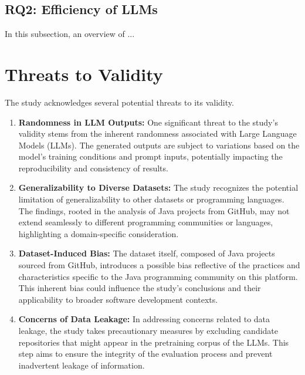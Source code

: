 \vspace{0.1 cm}
\subsection{RQ2: Efficiency of LLMs}
\label{sec:results_rq2}
\vspace{0.1 cm}

In this subsection, an overview of ...

\section{Threats to Validity}
\label{sec:t2v}
\vspace{0.2 cm}

The study acknowledges several potential threats to its validity.

\begin{enumerate}
    \item \textbf{Randomness in LLM Outputs:} One significant threat to the study's validity stems from the inherent randomness associated with Large Language Models (LLMs). The generated outputs are subject to variations based on the model's training conditions and prompt inputs, potentially impacting the reproducibility and consistency of results.

    \item \textbf{Generalizability to Diverse Datasets:} The study recognizes the potential limitation of generalizability to other datasets or programming languages. The findings, rooted in the analysis of Java projects from GitHub, may not extend seamlessly to different programming communities or languages, highlighting a domain-specific consideration.

    \item \textbf{Dataset-Induced Bias:} The dataset itself, composed of Java projects sourced from GitHub, introduces a possible bias reflective of the practices and characteristics specific to the Java programming community on this platform. This inherent bias could influence the study's conclusions and their applicability to broader software development contexts.

    \item \textbf{Concerns of Data Leakage:} In addressing concerns related to data leakage, the study takes precautionary measures by excluding candidate repositories that might appear in the pretraining corpus of the LLMs. This step aims to ensure the integrity of the evaluation process and prevent inadvertent leakage of information.


\end{enumerate}
